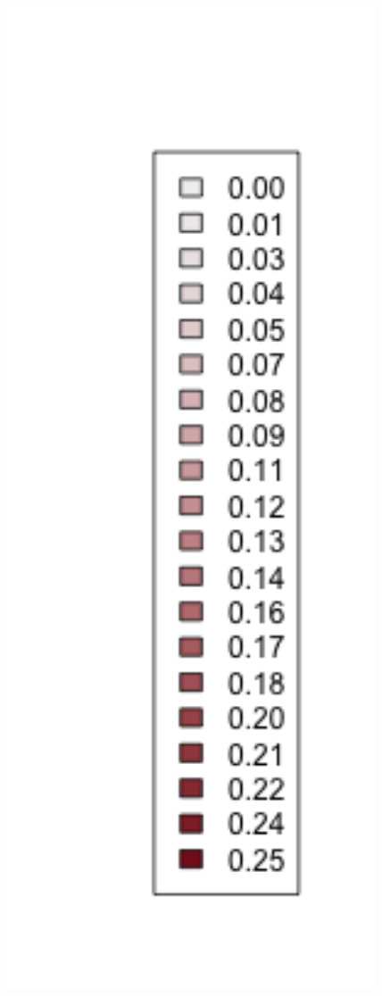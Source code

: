 \documentclass[ xcolor = pdftex, dvipsnames, table ]{beamer}
\begin{document}
\begin{frame}
\begin{figure}[h!]
\begin{minipage}[h!]{0.44\textwidth}
\end{minipage}
\begin{minipage}[h!]{0.09\textwidth}
\hspace{-1cm}
\includegraphics[width=1.5\textwidth]{../../ptNew/subLegnd.png}

\end{minipage}
\end{figure}
\end{frame}
\end{document}
